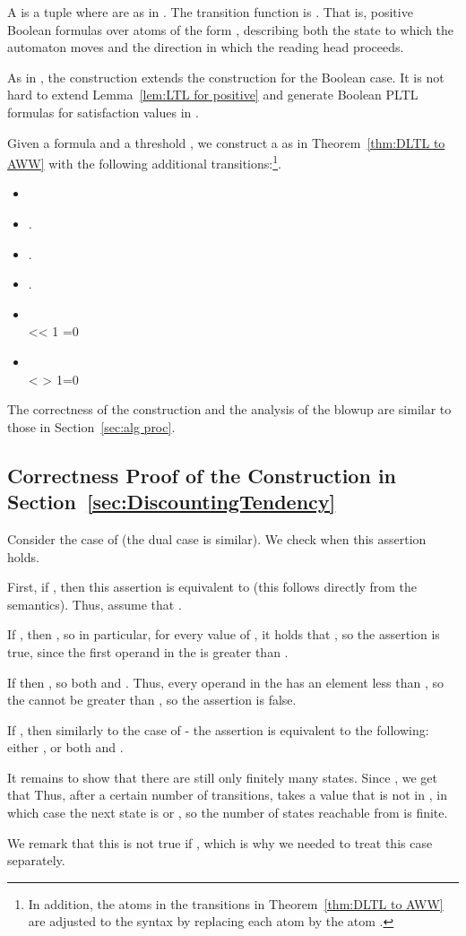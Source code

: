 \documentclass{llncs}
\newcommand{\df}{\eta}
\begin{document}
A  is a tuple  where  are as in . The transition function is . That is, positive Boolean formulas over atoms of the form , describing both the state to which the automaton moves and the direction in which the reading head proceeds.


As in , the construction extends the construction for the Boolean case. 
It is not hard to extend Lemma~\ref{lem:LTL for positive} and generate Boolean PLTL formulas for satisfaction values in . 

Given a  formula  and a threshold , we construct a  as in
Theorem~\ref{thm:DLTL to AWW} with the following additional transitions:\footnote{In addition, the atoms in the transitions in Theorem~\ref{thm:DLTL to AWW} are adjusted to the  syntax by replacing each atom  by the atom .}.
\begin{itemize}
\item 
\item .
\item .
\item .

\item 
\\ <\frac{t}{\df(0)}< 1\frac{t}{\df(0)} \frac{t}{\df(0)}=0

\item 
\\ <\frac{t}{\df(0)}\frac{t}{\df(0)} > 1\frac{t}{\df(0)}=0
\end{itemize}



The correctness of the construction and the analysis of the blowup
are similar to those in Section~\ref{sec:alg proc}. 


\subsection{Correctness Proof of the Construction in Section~\ref{sec:DiscountingTendency}}
\label{apx:disc tendency proof}
Consider the case of  (the dual case is similar). We check when this assertion holds.

First, if , then this assertion is equivalent to  (this follows directly from the semantics).
Thus, assume that .

If , then , so in particular, for every value of , it holds that , so the assertion is true, since the first operand in the  is greater than .

If  then , so both
 and . Thus, every operand in the  has an element less than , so the  cannot be greater than , so the assertion is false.

If , then similarly to the case of  - the assertion is equivalent to the following: either , or both  and .


It remains to show that there are still only finitely many states. Since , we get that 
Thus, after a certain number of transitions,  takes a value that is not in , in which case the next state is  or , so the number of states reachable from  is finite.

We remark that this is not true if , which is why we needed to treat this case separately.
\end{document}

